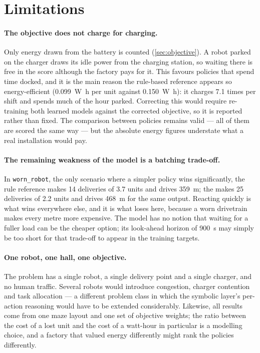 \section{Limitations}
\label{sec:limitations}

\paragraph{The objective does not charge for charging.}
Only energy drawn from the battery is counted (\cref{sec:objective}). A robot parked on the charger
draws its idle power from the charging station, so waiting there is free in the score although the
factory pays for it. This favours policies that spend time docked, and it is the main reason the
rule-based reference appears so energy-efficient (\SI{0.099}{\watt\hour} per unit against
\SI{0.150}{\watt\hour}): it charges \num{7.1} times per shift and spends much of the hour parked.
Correcting this would require re-training both learned models against the corrected objective, so
it is reported rather than fixed. The comparison between policies remains valid --- all of them are
scored the same way --- but the absolute energy figures understate what a real installation would
pay.

\paragraph{The remaining weakness of the model is a batching trade-off.}
In \texttt{worn\_robot}, the only scenario where a simpler policy wins significantly, the rule
reference makes \num{14} deliveries of \num{3.7} units and drives \SI{359}{\metre}; the \NS makes
\num{25} deliveries of \num{2.2} units and drives \SI{468}{\metre} for the same output. Reacting
quickly is what wins everywhere else, and it is what loses here, because a worn drivetrain makes
every metre more expensive. The model has no notion that waiting for a fuller load can be the
cheaper option; its look-ahead horizon of \SI{900}{\second} may simply be too short for that
trade-off to appear in the training targets.

\paragraph{One robot, one hall, one objective.}
The problem has a single robot, a single delivery point and a single charger, and no human traffic.
Several robots would introduce congestion, charger contention and task allocation --- a different
problem class in which the symbolic layer's per-action reasoning would have to be extended
considerably. Likewise, all results come from one maze layout and one set of objective weights;
the ratio between the cost of a lost unit and the cost of a watt-hour in particular is a modelling
choice, and a factory that valued energy differently might rank the policies differently.

